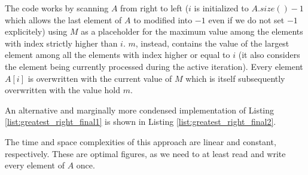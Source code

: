 

The code works by scanning $A$ from right to left ($i$ is initialized to $A.size()-1$ which allows the last element of $A$ to modified into $-1$ even if we do not set $-1$ explicitely) using $M$ as a placeholder for the maximum value among the elements with index strictly higher than $i$. 
$m$, instead, contains the value of the largest element among all the elements with index higher or equal to $i$ (it also considers the element being currently processed during the active iteration). 
Every element $A[i]$ is overwritten with the current value of $M$ which is itself subsequently overwritten with the value hold $m$.

An alternative and marginally more condensed implementation of Listing \ref{list:greatest_right_final1} is shown in Listing \ref{list:greatest_right_final2}.



The time and space complexities of this approach are linear and constant, respectively. These are optimal figures, as we need to at least read and write every element of $A$ once. 
